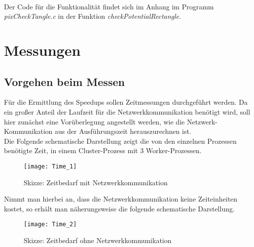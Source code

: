 \documentclass[
10pt, %
a4paper, %
oneside, %
headinclude,footinclude, %
BCOR5mm, %
]{scrartcl}
\begin{document}
\begin{algorithm}[H]
{{		}
	}
\end{algorithm}\

Der Code für die Funktionalität findet sich im Anhang im Programm \textit{pixCheckTangle.c} in der Funktion \textit{checkPotentialRectangle}.

\section{Messungen}
\subsection{Vorgehen beim Messen}

Für die Ermittlung des Speedups sollen Zeitmessungen durchgeführt werden. Da ein großer Anteil der Laufzeit für die Netzwerkkommunikation benötigt wird, soll hier zunächst eine Vorüberlegung angestellt werden, wie die Netzwerk-Kommunikation aus der Ausführungszeit herauszurechnen ist. \\Die Folgende schematische Darstellung zeigt die von den einzelnen Prozessen benötigte Zeit, in einem Cluster-Prozess mit 3 Worker-Prozessen.

\begin{figure}[h]
	\centering 
	\texttt{[image: Time\_1]} 
	\caption[Skizze: Zeitbedarf mit Netzwerkkommunikation]{Skizze: Zeitbedarf mit Netzwerkkommunikation }
	
\end{figure}

Nimmt man hierbei an, dass die Netzwerkkommunikation keine Zeiteinheiten kostet, so erhält man näherungsweise die folgende schematische Darstellung.

\begin{figure}[h]
	\centering 
	\texttt{[image: Time\_2]} 
	\caption[Skizze: Zeitbedarf ohne Netzwerkkommunikation]{Skizze: Zeitbedarf ohne Netzwerkkommunikation}
	
\end{figure}
\end{document}
